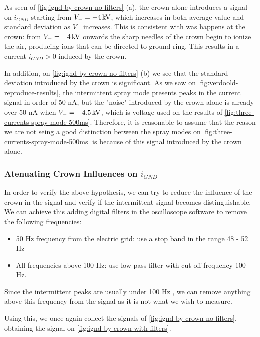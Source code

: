\documentclass[oneside,12pt]{article}
\begin{document}
As seen of \autoref{fig:ignd-by-crown-no-filters} (a), the crown alone introduces a signal on $i_{GND}$ starting
from $V_- = - 4 \,\mathrm{kV}$, which increases in both average value and standard deviation as $V_-$ increases.
This is consistent with was happens at the crown: from $V_- = - 4 \,\mathrm{kV}$ onwards the sharp needles 
of the crown begin to ionize the air, producing ions that can be 
directed to ground ring. This results in a current $i_{GND} > 0$ induced by the crown.

In addition, on \autoref{fig:ignd-by-crown-no-filters} (b) we see that the standard deviation introduced by the crown
is significant. As we saw on \autoref{fig:verdoold-reproduce-results}, the intermittent spray mode 
presents peaks in the current signal in order of 50 nA, but the "noise" introduced by the 
crown alone is already over 50 nA when $V_- = -4.5 \,\mathrm{kV}$, which is voltage used on the results 
of \autoref{fig:three-currents-spray-mode-500ms}. Therefore, it is reasonable to assume that the reason we are
not seing a good distinction between the spray modes on \autoref{fig:three-currents-spray-mode-500ms} is 
because of this signal introduced by the crown alone.

\subsubsection{Atenuating Crown Influences on $i_{GND}$}

In order to verify the above hypothesis, we can try to reduce the influence of the crown
in the signal and verify if the intermittent signal becomes distinguishable. We can achieve this adding digital filters 
in the oscilloscope software to remove the following frequencies:

\begin{itemize}
    \item 50 Hz frequency from the electric grid: use a stop band in the range 48 - 52 Hz
    \item All frequencies above 100 Hz: use low pass filter with cut-off frequency 100 Hz.
\end{itemize}

Since the intermittent peaks are usually under 100 Hz \citep{Verdoold2013}, we can remove 
anything above this frequency from the signal as it is not what we wish to measure.

Using this, we once again collect the signals of \autoref{fig:ignd-by-crown-no-filters}, obtaining the signal 
on \autoref{fig:ignd-by-crown-with-filters}.
\end{document}
